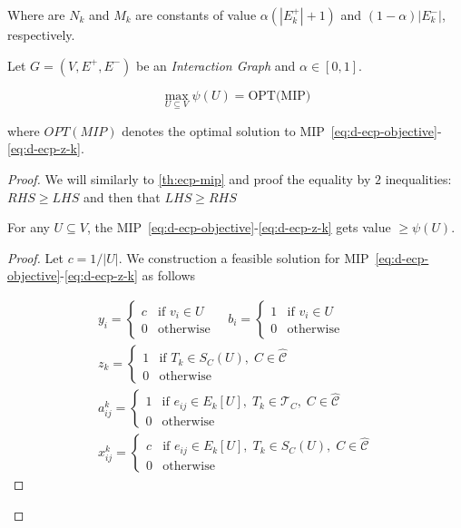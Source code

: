 Where are $N_k$ and $M_k$ are constants of value $\alpha (|E_k^{+}| + 1)$ and $(1 -
	\alpha ) |E^{-}_k|$, respectively.

\begin{theorem}
	\label{th:d-ecp-mip}
	Let $G = (V, E^{+}, E^{-})$ be an \emph{Interaction Graph} and $\alpha \in
		[0, 1]$.

	\begin{equation}
		\max_{U \subseteq V} \psi(U) = \text{OPT(MIP)}
	\end{equation}

	where $OPT(MIP)$ denotes the optimal solution to
	MIP~\ref{eq:d-ecp-objective}-\ref{eq:d-ecp-z-k}.
\end{theorem}

\begin{proof}
	We will similarly to \autoref{th:ecp-mip} and proof the equality by $2$
	inequalities: $RHS \geq LHS$ and then that $LHS \geq RHS$

	\begin{claim}
		For any $U \subseteq V$, the
		MIP~\ref{eq:d-ecp-objective}-\ref{eq:d-ecp-z-k} gets value $\geq \psi(U)$.
	\end{claim}

	\begin{proof}
		Let $c = 1 / |U|$. We construction a feasible solution for
		MIP~\ref{eq:d-ecp-objective}-\ref{eq:d-ecp-z-k} as follows

		\begin{gather}
			\label{eq:ecpp-y}
			y_i = \begin{cases}
				c & \text{if } v_{i} \in U \\
				0 & \text{otherwise}
			\end{cases} \quad
			b_i = \begin{cases}
				1 & \text{if } v_{i} \in U \\
				0 & \text{otherwise}
			\end{cases} \\
			\label{eq:ecpp-z}
			z_k = \begin{cases}
				1 & \text{if } T_{k} \in S_{C}(U), \; C \in \mathcal{\hat{C}} \\
				0 & \text{otherwise}
			\end{cases} \\
			\label{eq:ecpp-x}
			a_{ij}^{k} = \begin{cases}
				1 & \text{if } e_{ij} \in E_{k}[U], \; T_{k} \in \mathcal{T} _C, \; C \in
				\mathcal{\hat{C}}                                                         \\
				0 & \text{otherwise}
			\end{cases} \\
			x_{ij}^{k} = \begin{cases}
				c & \text{if } e_{ij} \in E_{k}[U], \; T_{k} \in S_C(U), \; C \in
				\mathcal{\hat{C}}                                                 \\
				0 & \text{otherwise}
			\end{cases}
		\end{gather}


\end{proof}
\end{proof}
